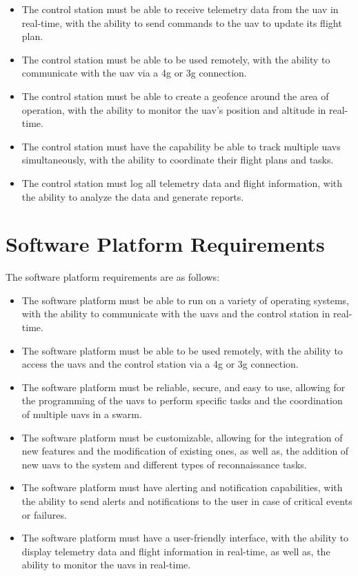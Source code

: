 \begin{itemize}
  \item The control station must be able to receive telemetry data from the \gls{uav} in real-time, with the ability to send commands to the \gls{uav} to update its flight plan.

  \item The control station must be able to be used remotely, with the ability to communicate with the \gls{uav} via a \gls{4g} or \gls{3g} connection.

  \item The control station must be able to create a geofence around the area of operation, with the ability to monitor the \gls{uav}'s position and altitude in real-time.

  \item The control station must have the capability be able to track multiple \glspl{uav} simultaneously, with the ability to coordinate their flight plans and tasks.

  \item The control station must log all telemetry data and flight information, with the ability to analyze the data and generate reports.
\end{itemize}

\section{Software Platform Requirements}

The software platform requirements are as follows:

\begin{itemize}
  \item The software platform must be able to run on a variety of operating systems, with the ability to communicate with the \glspl{uav} and the control station in real-time.

  \item The software platform must be able to be used remotely, with the ability to access the \glspl{uav} and the control station via a \gls{4g} or \gls{3g} connection.

  \item The software platform must be reliable, secure, and easy to use, allowing for the programming of the \glspl{uav} to perform specific tasks and the coordination of multiple \glspl{uav} in a swarm.

  \item The software platform must be customizable, allowing for the integration of new features and the modification of existing ones, as well as, the addition of new \glspl{uav} to the system and different types of reconnaissance tasks.

  \item The software platform must have alerting and notification capabilities, with the ability to send alerts and notifications to the user in case of critical events or failures.

  \item The software platform must have a user-friendly interface, with the ability to display telemetry data and flight information in real-time, as well as, the ability to monitor the \glspl{uav} in real-time.
\end{itemize}
